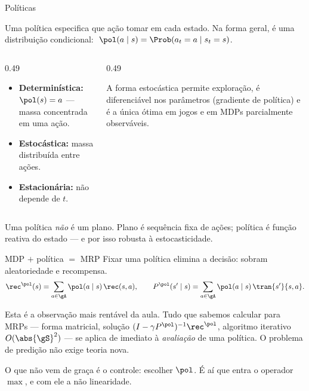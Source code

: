 \documentclass[aspectratio=169, 11pt]{beamer}
\begin{document}
\begin{frame}{Políticas}
  \begin{defbox}{}
    Uma política especifica que ação tomar em cada estado. Na forma geral, é uma
    distribuição condicional: $\;\pol(a \mid s) = \Prob(a_t = a \mid s_t = s)$.
  \end{defbox}
  \begin{columns}[T]
    \begin{column}{0.49\textwidth}
      {\small
      \begin{itemize}\setlength{\itemsep}{0.4ex}
        \item \textbf{Determinística:} $\pol(s) = a$ --- massa concentrada em uma ação.
        \item \textbf{Estocástica:} massa distribuída entre ações.
        \item \textbf{Estacionária:} não depende de $t$.
      \end{itemize}}
    \end{column}
    \begin{column}{0.49\textwidth}
      \begin{ideiabox}
        A forma estocástica permite exploração, é diferenciável nos parâmetros
        (gradiente de política) e é a única ótima em jogos e em MDPs parcialmente
        observáveis.
      \end{ideiabox}
    \end{column}
  \end{columns}
  \begin{alertabox}
    Uma política \emph{não} é um plano. Plano é sequência fixa de ações; política é
    \alert{função reativa} do estado --- e por isso robusta à estocasticidade.
  \end{alertabox}
\end{frame}

\begin{frame}{MDP $+$ política $=$ MRP}
  Fixar uma política elimina a decisão: sobram aleatoriedade e recompensa.
  \[
    \rec^{\pol}(s) = \sum_{a \in \gA} \pol(a \mid s)\, \rec(s,a),
    \qquad
    P^{\pol}(s' \mid s) = \sum_{a \in \gA} \pol(a \mid s)\, \tran{s'}{s,a}.
  \]
  \begin{ideiabox}
    Esta é a observação mais rentável da aula. \alert{Tudo} que sabemos calcular para
    MRPs --- forma matricial, solução $(I - \gamma P^{\pol})^{-1} \rec^{\pol}$, algoritmo
    iterativo $O(\abs{\gS}^2)$ --- se aplica de imediato à \emph{avaliação} de uma
    política. O problema de predição não exige teoria nova.
  \end{ideiabox}
  \begin{alertabox}
    O que não vem de graça é o \alert{controle}: escolher $\pol$. É aí que entra o
    operador $\max$, e com ele a não linearidade.
  \end{alertabox}
\end{frame}
\end{document}
